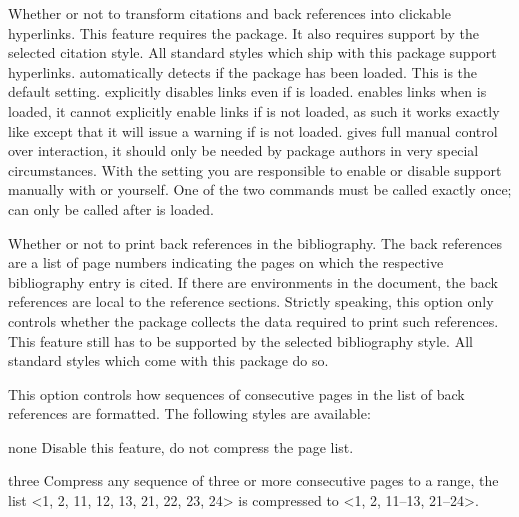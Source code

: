 \documentclass{ltxdockit}[2011/03/25]
\newcommand*{\biblatex}{\sty{biblatex}\xspace}
\begin{document}
\begin{optionlist}
Whether or not to transform citations and back references into clickable hyperlinks. This feature requires the  package. It also requires support by the selected citation style. All standard styles which ship with this package support hyperlinks.  automatically detects if the  package has been loaded. This is the default setting.  explicitly disables links even if  is loaded.  enables links when  is loaded, it cannot explicitly enable links if  is not loaded, as such it works exactly like  except that it will issue a warning if  is not loaded.  gives full manual control over  interaction, it should only be needed by package authors in very special circumstances. With the  setting you are responsible to enable or disable  support manually with  or  yourself. One of the two commands must be called exactly once;  can only be called after  is loaded.


Whether or not to print back references in the bibliography. The back references are a list of page numbers indicating the pages on which the respective bibliography entry is cited. If there are  environments in the document, the back references are local to the reference sections. Strictly speaking, this option only controls whether the \biblatex package collects the data required to print such references. This feature still has to be supported by the selected bibliography style. All standard styles which come with this package do so.


This option controls how sequences of consecutive pages in the list of back references are formatted. The following styles are available:

\begin{valuelist}

\item[none] Disable this feature, \ie do not compress the page list.

\item[three] Compress any sequence of three or more consecutive pages to a range, \eg the list <1, 2, 11, 12, 13, 21, 22, 23, 24> is compressed to <1, 2, 11--13, 21--24>.


\end{valuelist}
\end{optionlist}
\end{document}
